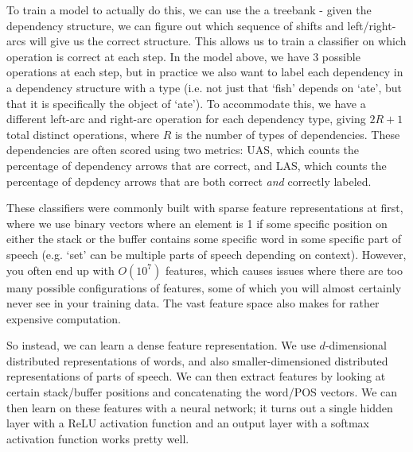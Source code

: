 To train a model to actually do this, we can use the a treebank - given the dependency structure, we can figure out which sequence of shifts and left/right-arcs will give us the correct structure. This allows us to train a classifier on which operation is correct at each step. In the model above, we have 3 possible operations at each step, but in practice we also want to label each dependency in a dependency structure with a type (i.e. not just that `fish' depends on `ate', but that it is specifically the object of `ate'). To accommodate this, we have a different left-arc and right-arc operation for each dependency type, giving $2R+1$ total distinct operations, where $R$ is the number of types of dependencies. These dependencies are often scored using two metrics: UAS, which counts the percentage of dependency arrows that are correct, and LAS, which counts the percentage of depdency arrows that are both correct \emph{and} correctly labeled.

These classifiers were commonly built with sparse feature representations at first, where we use binary vectors where an element is 1 if some specific position on either the stack or the buffer contains some specific word in some specific part of speech (e.g. `set' can be multiple parts of speech depending on context). However, you often end up with $O(10^7)$ features, which causes issues where there are too many possible configurations of features, some of which you will almost certainly never see in your training data. The vast feature space also makes for rather expensive computation.

So instead, we can learn a dense feature representation. We use $d$-dimensional distributed representations of words, and also smaller-dimensioned distributed representations of parts of speech. We can then extract features by looking at certain stack/buffer positions and concatenating the word/POS vectors. We can then learn on these features with a neural network; it turns out a single hidden layer with a ReLU activation function and an output layer with a softmax activation function works pretty well.
